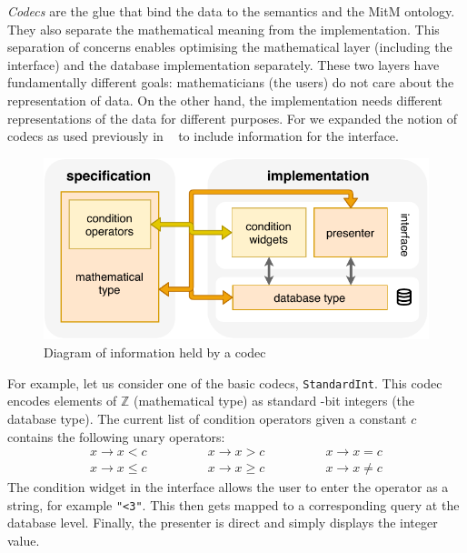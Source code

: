 \medskip

\emph{Codecs} are the glue that bind the data to the semantics and the MitM ontology.
They also separate the mathematical meaning from the implementation.
This separation of concerns enables optimising the mathematical layer (including the interface)
and the database implementation separately.
These two layers have fundamentally different goals: 
mathematicians (the users) do not care about the representation of data.
On the other hand, the implementation needs 
different representations of the data for different purposes.
For \dmh we expanded the notion of codecs as used previously in \pn~\cite{WieKohRab:vtuimkb17}
to include information for the interface.
\begin{figure}[ht]
  \includegraphics{codec.pdf}
  \caption{Diagram of information held by a \dmh codec}\label{fig:codec}
\end{figure}

For example, let us consider one of the basic codecs, \texttt{StandardInt}.
This codec encodes elements of $\mathbb{Z}$ (mathematical type) 
as standard -bit integers (the database type).
The current list of condition operators given a constant $c$ contains the following unary operators:
$$
\begin{array}{ccc}
x \rightarrow x < c \qquad & \qquad x \rightarrow x > c \qquad & \qquad x \rightarrow x = c \\
x \rightarrow x \leq c \qquad & \qquad x \rightarrow x \geq c \qquad & \qquad x \rightarrow x \neq c
\end{array}
$$
The condition widget in the interface allows the user to enter the operator as a string,
for example \texttt{"<3"}.
This then gets mapped to a corresponding query at the database level.
Finally, the presenter is direct and simply displays the integer value.


